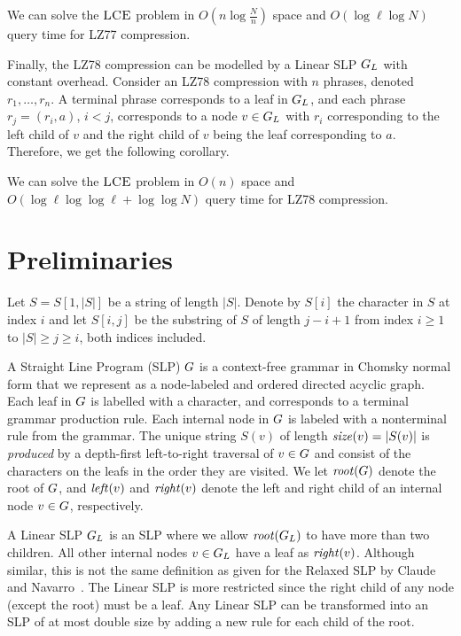 \begin{corollary}
	We can solve the $\textsc{LCE}$ problem in $O(n \log \frac{N}{n})$ space and $O(\log \ell \log N)$ query time for LZ77 compression.
\end{corollary}

\noindent Finally, the LZ78 compression can be modelled by a Linear SLP $G_L$ with constant overhead. Consider an LZ78 compression with $n$ phrases, denoted $r_1, \ldots, r_n$. A terminal phrase corresponds to a leaf in $G_L$, and each phrase $r_j = (r_i, a)$, $i < j$, corresponds to a node $v \in G_L$ with $r_i$ corresponding to the left child of $v$ and the right child of $v$ being the leaf corresponding to $a$. Therefore, we get the following corollary.

\begin{corollary}
	We can solve the $\textsc{LCE}$ problem in $O(n)$ space and $O(\log \ell \log \log \ell + \log \log N)$ query time for LZ78 compression.
\end{corollary}

\section{Preliminaries}
Let $S = S[1, |S|]$ be a string of length $|S|$. Denote by $S[i]$ the character in $S$ at index $i$ and let $S[i, j]$ be the substring of $S$ of length $j - i+1$ from index $i \geq 1$ to $|S| \geq j \geq i$, both indices included.

A Straight Line Program (SLP) $G$ is a context-free grammar in Chomsky normal form that we represent as a node-labeled and ordered directed acyclic graph. Each leaf in $G$ is labelled with a character, and corresponds to a terminal grammar production rule. Each internal node in $G$ is labeled with a nonterminal rule from the grammar. The unique string $S(v)$ of length $\mathit{size}(v) = |S(v)|$ is \emph{produced} by a depth-first left-to-right traversal of $v \in G$ and consist of the characters on the leafs in the order they are visited. We let $\mathit{root}(G)$ denote the root of $G$, and $\mathit{left}(v)$ and $\mathit{right}(v)$ denote the left and right child of an internal node $v \in G$, respectively.

A Linear SLP $G_L$ is an SLP where we allow $\mathit{root}(G_L)$ to have more than two children. All other internal nodes $v \in G_L$ have a leaf as $\mathit{right}(v)$. Although similar, this is not the same definition as given for the Relaxed SLP by Claude and Navarro~\cite{claude2011self}. The Linear SLP is more restricted since the right child of any node (except the root) must be a leaf. Any Linear SLP can be transformed into an SLP of at most double size by adding a new rule for each child of the root.

